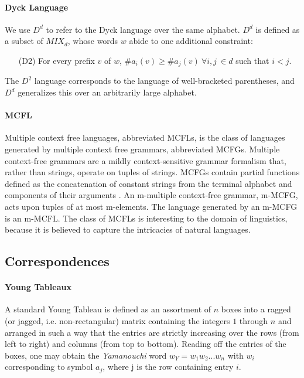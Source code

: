 \documentclass[nonatbib,numbers,10pt]{sigplanconf}
\begin{document}
\paragraph{Dyck Language}
We use $D^d$ to refer to the Dyck language over the same alphabet. $D^d$ is defined as a subset of $MIX_d$, whose words $w$ abide to one additional constraint:
\begin{itemize}
\item[(D2)] For every prefix $v$ of $w$, $ \#a_i(v) \geq \#a_j(v) \ \forall i, j \ \in d$ such that $i < j$.
\end{itemize}

The $D^2$ language corresponds to the language of well-bracketed parentheses, and $D^d$ generalizes this over an arbitrarily large alphabet.
\paragraph{MCFL}
Multiple context free languages, abbreviated MCFLs, is the class of languages generated by multiple context free grammars, abbreviated MCFGs. Multiple context-free grammars are a mildly context-sensitive grammar formalism that, rather than strings, operate on tuples of strings. MCFGs contain partial functions defined as the concatenation of constant strings from the terminal alphabet and components of their arguments \cite{gotzmann}. An m-multiple context-free grammar, m-MCFG, acts upon tuples of at most m-elements. The language generated by an m-MCFG is an m-MCFL. The class of MCFLs is interesting to the domain of linguistics, because it is believed to capture the intricacies of natural languages.

\subsection{Correspondences}
%
\paragraph{Young Tableaux}
A standard Young Tableau is defined as an assortment of $n$ boxes into a ragged (or jagged, i.e. non-rectangular) matrix containing the integers $1$ through $n$ and arranged in such a way that the entries are strictly increasing over the rows (from left to right) and columns (from top to bottom). Reading off the entries of the boxes, one may obtain the \textit{Yamanouchi} word $w_Y =w_1 w_2 ... w_n$ with $w_i$ corresponding to symbol $a_j$, where j is the row containing entry $i$.
\end{document}
